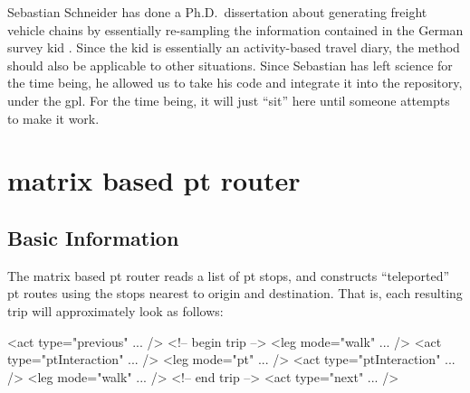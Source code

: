 
Sebastian Schneider has done a Ph.D.\ dissertation about generating freight vehicle chains by essentially re-sampling the information contained in the German survey \gls{kid} \citep{SteinmeyerWagner2005KiD}.  
Since the \gls{kid} is essentially an activity-based travel diary, the method should also be applicable to other situations.
Since Sebastian has left science for the time being, he allowed us to take his code and integrate it into the repository, under the \gls{gpl}. For the time being, it will just ``sit'' here until someone attempts to make it work.

%


\section{matrix based pt router}
\label{sec:matrix-based-pt-router}


\subsection{Basic Information}

The matrix based \gls{pt} router reads a list of \gls{pt} stops, and constructs ``teleported'' \gls{pt} routes using the stops nearest to origin and destination.  That is, each resulting trip will approximately look as follows:
\begin{xml}
<act type="previous" ... />
<!-- begin trip -->
<leg mode="walk" ... />
<act type="ptInteraction" ... />
<leg mode="pt" ... />
<act type="ptInteraction" ... />
<leg mode="walk" ... />
<!-- end trip -->
<act type="next" ... />  
\end{xml}


